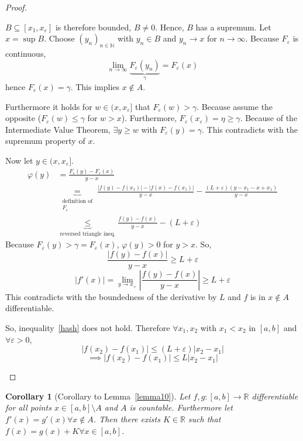 \documentclass{article}
\newtheorem*{corollary}{Corollary}%
\newcommand{\card}[1]{\left|#1\right|}
\begin{document}
\begin{proof}
\begin{enumerate}
      $B \subseteq [x_1, x_{\varepsilon}]$ is therefore bounded, $B \neq 0$.
      Hence, $B$ has a supremum. Let $x = \sup{B}$.
      Choose $(y_n)_{n \in \mathbb N}$ with $y_n \in B$ and $y_n \to x$ for $n \to \infty$.
      Because $F_{\varepsilon}$ is continuous,
      \[ \lim_{n\to\infty} \underbrace{F_{\varepsilon}(y_n)}_{\gamma} = F_{\varepsilon}(x) \]
      hence $F_{\varepsilon}(x) = \gamma$. This implies $x \not\in A$.

      Furthermore it holds for $w \in (x, x_\varepsilon]$ that $F_{\varepsilon}(w) > \gamma$.
      Because assume the opposite ($F_{\varepsilon}(w) \leq \gamma$ for $w > x$).
      Furthermore, $F_{\varepsilon}(x_{\varepsilon}) = \eta \geq \gamma$.
      Because of the Intermediate Value Theorem, $\exists y \geq w$ with $F_{\varepsilon}(y) = \gamma$.
      This contradicts with the supremum property of $x$.

      Now let $y \in (x, x_{\varepsilon}]$.
      \begin{align*}
        \varphi(y) &= \frac{F_{\varepsilon}(y) - F_{\varepsilon}(x)}{y - x} \\
          &\underbrace{=}_{\substack{\text{definition of} \\ F_{\varepsilon}}}
          \frac{\card{f(y) - f(x_1)} - \card{f(x) - f(x_1)}}{y - x} - \frac{(L + \varepsilon)(y - x_1 - x + x_1)}{y - x} \\
          &\underbrace{\leq}_{\text{reversed triangle ineq.}} \frac{f(y) - f(x)}{y - x} - (L + \varepsilon)
      \end{align*}
      Because $F_{\varepsilon}(y) > \gamma = F_{\varepsilon}(x)$, $\varphi(y) > 0$ for $y > x$.
      So,
      \[ \frac{\card{f(y) - f(x)}}{y - x} \geq L + \varepsilon \]
      \[ \card{f'(x)} = \lim_{y \to x_+} \card{\frac{f(y) - f(x)}{y - x}} \geq L + \varepsilon \]
      This contradicts with the boundedness of the derivative by $L$ and $f$ is in $x \not\in A$ differentiable.

      So, inequality~\eqref{hash} does not hold. Therefore $\forall x_1, x_2$ with $x_1 < x_2$ in $[a,b]$ and $\forall \varepsilon > 0$,
      \[ \card{f(x_2) - f(x_1)} \leq (L + \varepsilon)\card{x_2 - x_1} \]
      \[ \implies \card{f(x_2) - f(x_1)} \leq L \card{x_2 - x_1} \]
  \end{enumerate}
\end{proof}

\begin{corollary}[Corollary to Lemma~\ref{lemma10}]
  Let $f, g: [a,b] \to \mathbb R$ differentiable for all points $x \in [a,b] \setminus A$
  and $A$ is countable. Furthermore let $f'(x) = g'(x) \forall x \not\in A$.
  Then there exists $K \in \mathbb R$ such that $f(x) = g(x) + K \forall x \in [a,b]$.
\end{corollary}
\end{document}
